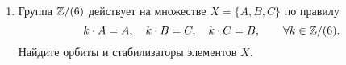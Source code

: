 \begin{enumerate}
    \item Группа $\mathbb Z / (6)$ действует на множестве $X = \{A, B, C\}$ по правилу
         $$k \cdot A = A, \quad k \cdot B = C, \quad k \cdot C = B, \qquad \forall k \in \mathbb Z / (6).$$
         Найдите орбиты и стабилизаторы элементов $X$.
\end{enumerate}
